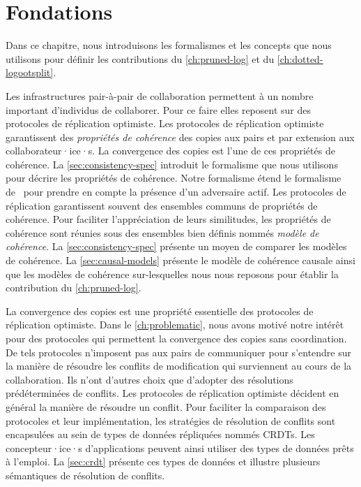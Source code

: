 
\chapter{Fondations}\label{ch:background}

\minitoc{}
\bigskip

Dans ce chapitre, nous introduisons les formalismes et les concepts que nous utilisons pour définir les contributions du \autoref{ch:pruned-log} et du \autoref{ch:dotted-logootsplit}.

Les infrastructures pair-à-pair de collaboration permettent à un nombre important d'individus de collaborer.
Pour ce faire elles reposent sur des protocoles de réplication optimiste.
Les protocoles de réplication optimiste garantissent des \emph{propriétés de cohérence} des copies aux pairs et par extension aux collaborateur·ice·s.
La convergence des copies est l'une de ces propriétés de cohérence.
La \autoref{sec:consistency-spec} introduit le formalisme que nous utilisons pour décrire les propriétés de cohérence.
Notre formalisme étend le formalisme de~\textcite{burckhardt_eventualconsistency_2014} pour prendre en compte la présence d'un adversaire actif.
Les protocoles de réplication garantissent souvent des ensembles communs de propriétés de cohérence.
Pour faciliter l'appréciation de leurs similitudes, les propriétés de cohérence sont réunies sous des ensembles bien définis nommés \emph{modèle de cohérence}.
La \autoref{sec:consistency-spec} présente un moyen de comparer les modèles de cohérence.
La \autoref{sec:causal-models} présente le modèle de cohérence causale ainsi que les modèles de cohérence sur-lesquelles nous nous reposons pour établir la contribution du \autoref{ch:pruned-log}.

La convergence des copies est une propriété essentielle des protocoles de réplication optimiste.
Dans le \autoref{ch:problematic}, nous avons motivé notre intérêt pour des protocoles qui permettent la convergence des copies sans coordination.
De tels protocoles n'imposent pas aux pairs de communiquer pour s'entendre sur la manière de résoudre les conflits de modification qui surviennent au cours de la collaboration.
Ils n'ont d'autres choix que d'adopter des résolutions prédéterminées de conflits.
Les protocoles de réplication optimiste décident en général la manière de résoudre un conflit.
Pour faciliter la comparaison des protocoles et leur implémentation, les stratégies de résolution de conflits sont encapsulées au sein de types de données répliquées nommés \acfp{CRDT}.
Les concepteur·ice·s d'applications peuvent ainsi utiliser des types de données prêts à l'emploi.
La \autoref{sec:crdt} présente ces types de données et illustre plusieurs sémantiques de résolution de conflits.

